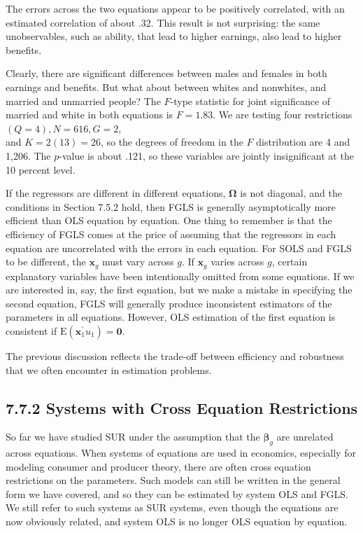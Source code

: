 \documentclass[10pt]{article}
\begin{document}
The errors across the two equations appear to be positively correlated, with an estimated correlation of about .32. This result is not surprising: the same unobservables, such as ability, that lead to higher earnings, also lead to higher benefits.

Clearly, there are significant differences between males and females in both earnings and benefits. But what about between whites and nonwhites, and married and unmarried people? The $F$-type statistic for joint significance of married and white in both equations is $F=1.83$. We are testing four restrictions $(Q=4), N=616, G=2$,\\
and $K=2(13)=26$, so the degrees of freedom in the $F$ distribution are 4 and 1,206. The $p$-value is about .121, so these variables are jointly insignificant at the 10 percent level.

If the regressors are different in different equations, $\boldsymbol{\Omega}$ is not diagonal, and the conditions in Section 7.5.2 hold, then FGLS is generally asymptotically more efficient than OLS equation by equation. One thing to remember is that the efficiency of FGLS comes at the price of assuming that the regressors in each equation are uncorrelated with the errors in each equation. For SOLS and FGLS to be different, the $\mathbf{x}_{g}$ must vary across $g$. If $\mathbf{x}_{g}$ varies across $g$, certain explanatory variables have been intentionally omitted from some equations. If we are interested in, say, the first equation, but we make a mistake in specifying the second equation, FGLS will generally produce inconsistent estimators of the parameters in all equations. However, OLS estimation of the first equation is consistent if $\mathrm{E}\left(\mathbf{x}_{1}^{\prime} u_{1}\right)=\mathbf{0}$.

The previous discussion reflects the trade-off between efficiency and robustness that we often encounter in estimation problems.

\subsection*{7.7.2 Systems with Cross Equation Restrictions}
So far we have studied SUR under the assumption that the $\boldsymbol{\beta}_{g}$ are unrelated across equations. When systems of equations are used in economics, especially for modeling consumer and producer theory, there are often cross equation restrictions on the parameters. Such models can still be written in the general form we have covered, and so they can be estimated by system OLS and FGLS. We still refer to such systems as SUR systems, even though the equations are now obviously related, and system OLS is no longer OLS equation by equation.
\end{document}
